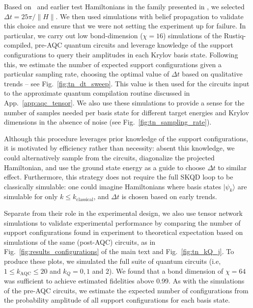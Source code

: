 \documentclass[
  reprint,            %
  amsmath,amssymb,
  aps,
  superscriptaddress, %
  longbibliography
]{revtex4-2}
\theoremstyle{definition}
\begin{document}
Based on~\cite{yu2025quantum} and earlier test Hamiltonians in the family presented in , we selected $\Delta t = 25\pi/\|H\|$.
We then used simulations with belief propagation to validate this choice and ensure that we were not setting the experiment up for failure. In particular, we carry out low bond-dimension ($\chi=16$) simulations of the Rustiq-compiled, pre-AQC quantum circuits and leverage knowledge of the support configurations to query their amplitudes in each Krylov basis state. Following this, we estimate the number of expected support configurations given a particular sampling rate, choosing the optimal value of $\Delta t$ based on qualitative trends -- see Fig.~\ref{fig:tn_dt_sweep}. This value is then used for the circuits input to the approximate quantum compilation routine discussed in App.~\ref{app:aqc_tensor}. We also use these simulations to provide a sense for the number of samples needed per basis state for different target energies and Krylov dimensions in the absence of noise (see Fig.~\ref{fig:tn_sampling_rate}).

Although this procedure leverages prior knowledge of the support configurations, it is motivated by efficiency rather than necessity: absent this knowledge, we could alternatively sample from the circuits, diagonalize the projected Hamiltonian, and use the ground state energy as a guide to choose $\Delta t$ to similar effect. Furthermore, this strategy does not require the full SKQD loop to be classically simulable: one could imagine Hamiltonians where basis states $|\psi_k\rangle$ are simulable for only $k\leq k_{\textrm{classical}}$, and $\Delta t$ is chosen based on early trends.

Separate from their role in the experimental design, we also use tensor network simulations to validate experimental performance by comparing the number of support configurations found in experiment to theoretical expectation based on simulations of the same (post-AQC) circuits, as in Fig.~\ref{fig:results_configurations} of the main text and Fig.~\ref{fig:tn_kQ_j}. To produce these plots, we simulated the full suite of quantum circuits  (i.e, $1\leq k_{\textrm{AQC}} \leq 20$ and $k_Q=0,1$ and $2$). We found that a bond dimension of $\chi=64$ was sufficient to achieve estimated fidelities above 0.99. As with the simulations of the pre-AQC circuits, we estimate the expected number of configurations from the probability amplitude of all support configurations for each basis state.
\end{document}
